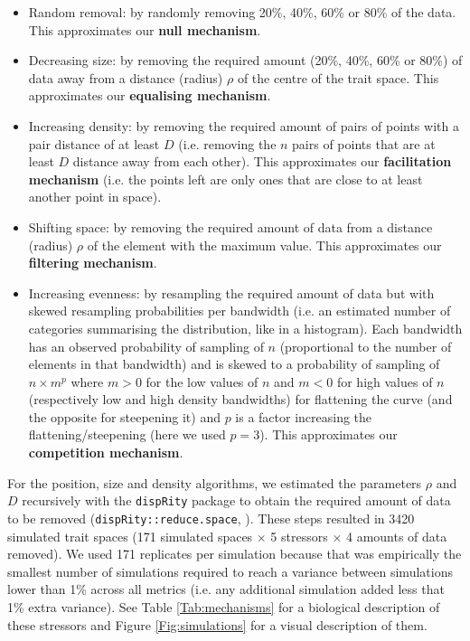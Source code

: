 \documentclass[12pt,letterpaper]{article}
\begin{document}
\begin{itemize}
\item Random removal: by randomly removing 20\%, 40\%, 60\% or 80\% of the data. This approximates our \textbf{null mechanism}.

\item Decreasing size: by removing the required amount (20\%, 40\%, 60\% or 80\%) of data away from a distance (radius)  $\rho$ of the centre of the trait space.
This approximates our \textbf{equalising mechanism}.

\item Increasing density: by removing the required amount of pairs of points with a pair distance of at least $D$ (i.e. removing the $n$ pairs of points that are at least $D$ distance away from each other).
This approximates our \textbf{facilitation mechanism} (i.e. the points left are only ones that are close to at least another point in space).

\item Shifting space: by removing the required amount of data from a distance (radius) $\rho$ of the element with the maximum value.
This approximates our \textbf{filtering mechanism}.

\item Increasing evenness: by resampling the required amount of data but with skewed resampling probabilities per bandwidth (i.e. an estimated number of categories summarising the distribution, like in a histogram).
Each bandwidth has an observed probability of sampling of $n$ (proportional to the number of elements in that bandwidth) and is skewed to a probability of sampling of $n \times m^{p}$ where $m>0$ for the low values of $n$ and $m<0$ for high values of $n$ (respectively low and high density bandwidths) for flattening the curve (and the opposite for steepening it) and $p$ is a factor increasing the flattening/steepening (here we used $p=3$).
This approximates our \textbf{competition mechanism}.
\end{itemize}

For the position, size and density algorithms, we estimated the parameters $\rho$ and $D$ recursively with the \texttt{dispRity} package to obtain the required amount of data to be removed (\texttt{dispRity::reduce.space}, \citealt{guillerme2018disprity,guillerme2020shifting}).
These steps resulted in 3420 simulated trait spaces (171 simulated spaces $\times$ 5 stressors $\times$ 4 amounts of data removed).
We used 171 replicates per simulation because that was empirically the smallest number of simulations required to reach a variance between simulations lower than 1\% across all metrics (i.e. any additional simulation added less that 1\% extra variance).
See Table \ref{Tab:mechanisms} for a biological description of these stressors and Figure \ref{Fig:simulations} for a visual description of them.
\end{document}
